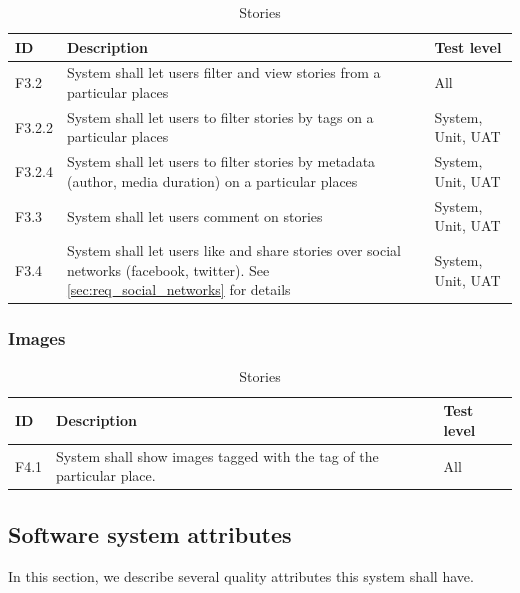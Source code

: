 \documentclass[11pt]{book}
\begin{document}
\begin{table}[H]
\centering
\begin{tabular}{ l  p{11cm} l }
    ID       & Description                                                                                              & Test level            \\ \hline
    F3.2     & System shall let users filter and view stories from a particular places                                  & All                   \\ \hline
    F3.2.2   & System shall let users to filter stories by tags on a particular places                                  & System, Unit, UAT     \\ \hline
    F3.2.4   & System shall let users to filter stories by metadata (author, media duration) on a particular places     & System, Unit, UAT     \\ \hline
    F3.3     & System shall let users comment on stories                                                                & System, Unit, UAT     \\ \hline
    F3.4     & System shall let users like and share stories over social networks (facebook, twitter). 
               See \ref{sec:req_social_networks} for details                                                            & System, Unit, UAT     \\
    \end{tabular}
\label{tab:req_stories}
\caption{Stories}
\end{table}

\subsubsection{Images}

\begin{table}[H]
\centering
\begin{tabular}{ l  p{11cm} l }
    ID       & Description                                                                                              & Test level            \\ \hline
    F4.1     & System shall show images tagged with the tag of the particular place.                                    & All                   \\
    \end{tabular}
\label{tab:req_images}
\caption{Stories}
\end{table}

\subsection{Software system attributes}\label{sec:req_software_system_attributes}
In this section, we describe several quality attributes this system shall have.
\end{document}
